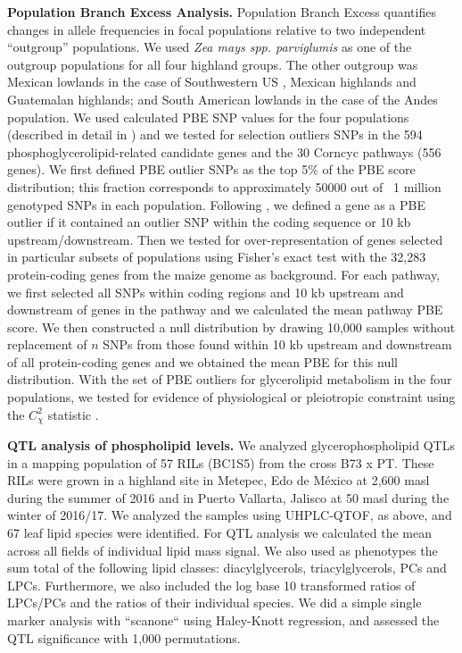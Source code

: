 \documentclass[9pt,twocolumn,twoside,lineno]{biorxiv}
\begin{document}
\textbf{Population Branch Excess Analysis.}
Population Branch Excess quantifies changes in allele frequencies in focal populations relative to two independent “outgroup” populations.
We used \textit{Zea mays spp. parviglumis} as one of the outgroup populations for all four highland groups.  
The other outgroup was  Mexican lowlands  in the case of Southwestern US , Mexican highlands and Guatemalan highlands; and South American lowlands in the case of the Andes population. 
We used calculated PBE SNP values for the four populations (described in detail in \cite{Wang2020-mp}) and we tested for selection outliers SNPs in the 594 phosphoglycerolipid-related candidate genes and the 30 Corncyc pathways (556 genes).
We first defined PBE outlier SNPs as the top 5\% of the PBE score distribution; this fraction corresponds to approximately 50000 out of ~1 million genotyped SNPs in each population. 
Following \cite{Wang2020-mp}, we defined a gene as a PBE outlier if it contained an outlier SNP within the coding sequence or 10 kb upstream/downstream. 
Then we tested for over-representation of genes selected in particular subsets of populations using Fisher's exact test with the 32,283 protein-coding genes from the maize genome as background. 
For each pathway, we first selected all SNPs within coding regions and 10 kb upstream and downstream of genes in the pathway and we calculated the mean pathway PBE score. 
We then constructed a null distribution by drawing 10,000 samples without replacement of $n$ SNPs from those found within 10 kb upstream and downstream of all protein-coding genes and we obtained the mean PBE for this null distribution. 
With the set of PBE outliers for glycerolipid metabolism in the four populations, we tested for evidence of physiological or pleiotropic constraint using the $C_\chi^2$ statistic \cite{yeaman2018}. 

\textbf{QTL analysis of phospholipid levels.}
We analyzed glycerophospholipid QTLs in a mapping population of 57 RILs (BC1S5) from the cross B73 x PT.
These RILs were grown in a highland site in Metepec, Edo de M\'exico at 2,600 masl during the summer of 2016 and in Puerto Vallarta, Jalisco at 50 masl during the winter of 2016/17. 
We analyzed the samples using UHPLC-QTOF, as above, and 67 leaf lipid species were identified.
For QTL analysis we calculated the mean across all fields of individual lipid mass signal. 
We also used as phenotypes the sum total of the following lipid classes: diacylglycerols, triacylglycerols, PCs and  LPCs.  
Furthermore,  we also included the log base 10 transformed ratios of LPCs/PCs and the ratios of their individual species. 
We did a simple single marker analysis  with ``scanone`` using Haley-Knott  regression, and assessed the QTL significance with 1,000 permutations.
\end{document}
